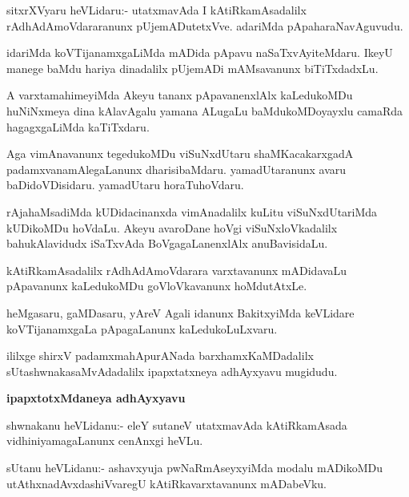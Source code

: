 \begin{mng}
sitxrXVyaru heVLidaru:- utatxmavAda I kAtiRkamAsadalilx rAdhAdAmoVdararanunx pUjemADutetxVve. adariMda pApaharaNavAguvudu.
\end{mng}

\begin{mng}
idariMda koVTijanamxgaLiMda mADida pApavu naSaTxvAyiteMdaru. IkeyU manege baMdu hariya dinadalilx pUjemADi mAMsavanunx biTiTxdadxLu.
\end{mng}

\begin{mng}
A varxtamahimeyiMda Akeyu tananx pApavanenxlAlx kaLedukoMDu huNiNxmeya dina kAlavAgalu yamana ALugaLu baMdukoMDoyayxlu camaRda hagagxgaLiMda kaTiTxdaru.
\end{mng}

\begin{mng}
Aga vimAnavanunx tegedukoMDu viSuNxdUtaru shaMKacakarxgadA padamxvanamAlegaLanunx dharisibaMdaru. yamadUtaranunx avaru baDidoVDisidaru. yamadUtaru horaTuhoVdaru.
\end{mng}

\begin{mng}
rAja{ha}MsadiMda kUDidacinanxda vimAnadalilx kuLitu viSuNxdUtariMda kUDikoMDu hoVdaLu. Akeyu avaroDane hoVgi viSuNxloVkadalilx bahukAlavidudx iSaTxvAda BoVgagaLanenxlAlx anuBavisidaLu.
\end{mng}

\begin{mng}
kAtiRkamAsadalilx rAdhAdAmoVdarara varxtavanunx mADidavaLu pApavanunx kaLedukoMDu goVloVkavanunx hoMdutAtxLe.
\end{mng}

\begin{mng}
heMgasaru, gaMDasaru, yAreV Agali idanunx BakitxyiMda keVLidare koVTijanamxgaLa pApagaLanunx kaLedukoLuLxvaru.
\end{mng}
ililxge shirxV padamxmahApurANada barxhamxKaMDadalilx sUtashwnakasaMvAdadalilx ipapxtatxneya adhAyxyavu mugidudu.

\begin{center}
\textbf{\large ipapxtotxMdaneya adhAyxyavu}
\end{center}

\begin{mng}
shwnakanu heVLidanu:- eleY sutaneV utatxmavAda kAtiRkamAsada vidhiniyamagaLanunx cenAnxgi heVLu.
\end{mng}

\begin{mng}
sUtanu heVLidanu:- ashavxyuja pwNaRmAseyxyiMda modalu mADikoMDu utAthxnadAvxdashiVvaregU kAtiRkavarxtavanunx mADabeVku.
\end{mng}

